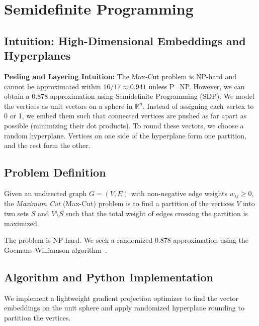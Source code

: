 \setcounter{chapter}{17}
\chapter{Semidefinite Programming}
\label{ch:sdp_maxcut}

\section{Intuition: High-Dimensional Embeddings and Hyperplanes}

\begin{intuitionbox}
\textbf{Peeling and Layering Intuition:} The Max-Cut problem is NP-hard and cannot be approximated within $16/17 \approx 0.941$ unless P=NP. However, we can obtain a $0.878$ approximation using Semidefinite Programming (SDP). We model the vertices as unit vectors on a sphere in $\mathbb{R}^n$. Instead of assigning each vertex to 0 or 1, we embed them such that connected vertices are pushed as far apart as possible (minimizing their dot products). To round these vectors, we choose a random hyperplane. Vertices on one side of the hyperplane form one partition, and the rest form the other.
\end{intuitionbox}

\section{Problem Definition}
Given an undirected graph $G = (V, E)$ with non-negative edge weights $w_{ij} \ge 0$, the \emph{Maximum Cut} (Max-Cut) problem is to find a partition of the vertices $V$ into two sets $S$ and $V \setminus S$ such that the total weight of edges crossing the partition is maximized.

The problem is NP-hard. We seek a randomized $0.878$-approximation using the Goemans-Williamson algorithm~\cite{goemans-williamson94}.

\section{Algorithm and Python Implementation}
We implement a lightweight gradient projection optimizer to find the vector embeddings on the unit sphere and apply randomized hyperplane rounding to partition the vertices.

